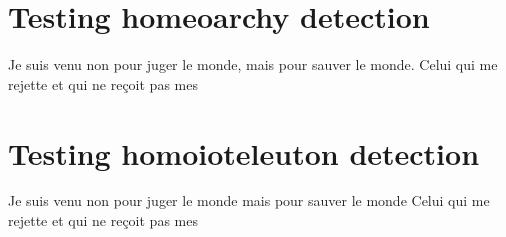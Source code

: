 \documentclass{article}
\begin{document}
\section{Testing homeoarchy detection}
\begin{minipage}{1.7in}
Je suis venu non pour juger le monde, mais pour sauver le monde. Celui qui me rejette
et qui ne re\c coit pas mes
\end{minipage}

\section{Testing homoioteleuton detection}
\begin{minipage}{1.7in}
\parindent=2cm
\indent Je suis venu non pour juger le monde mais pour sauver le monde Celui qui me rejette
et qui ne re\c coit pas mes
\end{minipage}
\end{document}
